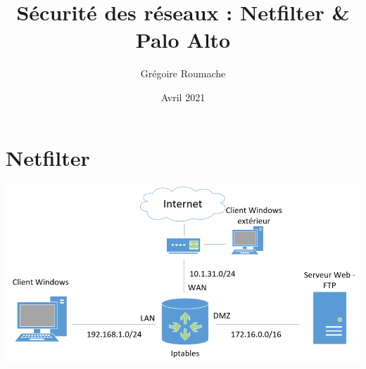 \documentclass[a4paper]{article}
\title{Sécurité des réseaux : Netfilter \& Palo Alto}
\author{Grégoire Roumache}
\date{Avril 2021}
\begin{document}
\maketitle















\section{Netfilter}





\begin{center} \includegraphics[width=0.95\linewidth]{images/topologie-netfilter-01.PNG} \end{center}
\end{document}
